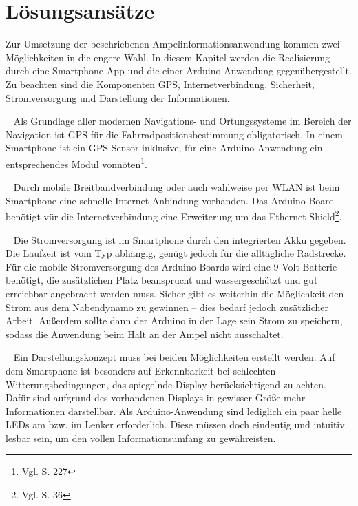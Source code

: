 \chapter{Lösungsansätze}
Zur Umsetzung der beschriebenen Ampelinformationsanwendung kommen zwei Möglichkeiten in die engere Wahl. In diesem Kapitel werden die Realisierung durch eine \gls{Smartphone} App und die einer \gls{Arduino}-Anwendung gegenübergestellt. Zu beachten sind die Komponenten \gls{GPS}, Internetverbindung, Sicherheit, Stromversorgung und Darstellung der Informationen.\\
\begin{description}[leftmargin=0.7cm,style=nextline]
  \item[\gls{GPS}] ~ Als Grundlage aller modernen Navigations- und Ortungssysteme im Bereich der Navigation ist \gls{GPS} für die Fahrradpositionsbestimmung obligatorisch. In einem \gls{Smartphone} ist ein \gls{GPS} Sensor inklusive, für eine \gls{Arduino}-Anwendung ein entsprechendes Modul vonnöten\footnote{ Vgl. \cite{arduino} S. 227}.\\
  \item[Internetverbindung] ~ Durch mobile Breitbandverbindung oder auch wahlweise per \gls{WLAN} ist beim \gls{Smartphone} eine schnelle Internet-Anbindung vorhanden. 
  Das \gls{Arduino}-Board benötigt vür die Internetverbindung eine Erweiterung um das Ethernet-Shield\footnote{ Vgl. \cite{arduino} S. 36}.\\
  \item[Stromversorgung] ~ Die Stromversorgung ist im \gls{Smartphone} durch den integrierten Akku gegeben. Die Laufzeit ist vom Typ abhängig, genügt jedoch für die alltägliche Radstrecke. Für die mobile Stromversorgung des \gls{Arduino}-Boards wird eine 9-Volt Batterie benötigt, die zusätzlichen Platz beansprucht und wassergeschützt und gut erreichbar angebracht werden muss. Sicher gibt es weiterhin die Möglichkeit den Strom aus dem Nabendynamo zu gewinnen -- dies bedarf jedoch zusätzlicher Arbeit. Außerdem sollte dann der \gls{Arduino} in der Lage sein Strom zu speichern, sodass die Anwendung beim Halt an der Ampel nicht ausschaltet.\\
  \item[Darstellung] ~ Ein Darstellungskonzept muss bei beiden Möglichkeiten erstellt werden. Auf dem \gls{Smartphone} ist besonders auf Erkennbarkeit bei schlechten Witterungsbedingungen, das spiegelnde Display berücksichtigend zu achten. Dafür sind aufgrund des vorhandenen Displays in gewisser Größe mehr Informationen darstellbar. Als \gls{Arduino}-Anwendung sind lediglich ein paar helle \glspl{LED} am bzw. im Lenker erforderlich. Diese müssen doch eindeutig und intuitiv lesbar sein, um den vollen Informationsumfang zu gewähreisten.

\end{description}
